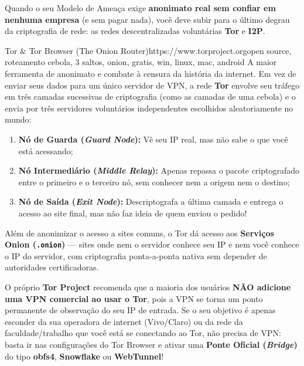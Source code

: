 \documentclass{pousadaguide}
\begin{document}
Quando o seu Modelo de Ameaça exige \textbf{anonimato real sem confiar em nenhuma empresa} (e sem pagar nada), você deve subir para o último degrau da criptografia de rede: as redes descentralizadas voluntárias \textbf{Tor} e \textbf{I2P}.

\begin{ferramenta}[goat,logo=tor]{Tor \& Tor Browser (The Onion Router)}{https://www.torproject.org}{open source, roteamento cebola, 3 saltos, onion, gratis, win, linux, mac, android}
A maior ferramenta de anonimato e combate à censura da história da internet. Em vez de enviar seus dados para um único servidor de VPN, a rede \textbf{Tor} envolve seu tráfego em três camadas sucessivas de criptografia (como as camadas de uma cebola) e o envia por três servidores voluntários independentes escolhidos aleatoriamente no mundo:
\begin{enumerate}
  \item \textbf{Nó de Guarda (\emph{Guard Node}):} Vê seu IP real, mas não sabe o que você está acessando;
  \item \textbf{Nó Intermediário (\emph{Middle Relay}):} Apenas repassa o pacote criptografado entre o primeiro e o terceiro nó, sem conhecer nem a origem nem o destino;
  \item \textbf{Nó de Saída (\emph{Exit Node}):} Descriptografa a última camada e entrega o acesso ao site final, mas não faz ideia de quem enviou o pedido!
\end{enumerate}
Além de anonimizar o acesso a sites comuns, o Tor dá acesso aos \textbf{Serviços Onion (\texttt{.onion})} — sites onde nem o servidor conhece seu IP e nem você conhece o IP do servidor, com criptografia ponta-a-ponta nativa sem depender de autoridades certificadoras. 
\end{ferramenta}

\begin{dica}
O próprio \textbf{Tor Project} recomenda que a maioria dos usuários \textbf{NÃO adicione uma VPN comercial ao usar o Tor}, pois a VPN se torna um ponto permanente de observação do seu IP de entrada. Se o seu objetivo é apenas esconder da sua operadora de internet (Vivo/Claro) ou da rede da faculdade/trabalho que você está se conectando ao Tor, não precisa de VPN: basta ir nas configurações do Tor Browser e ativar uma \textbf{Ponte Oficial (\emph{Bridge})} do tipo \textbf{obfs4}, \textbf{Snowflake} ou \textbf{WebTunnel}!
\end{dica}
\end{document}
